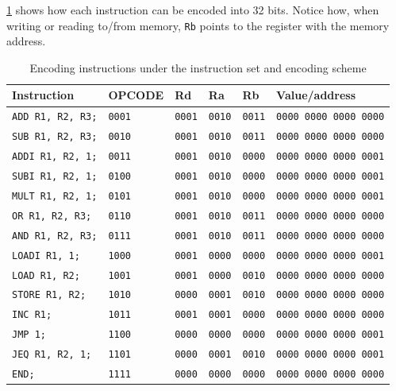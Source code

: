 \documentclass[a4paper, english]{article}
\numberwithin{equation}{section}
\begin{document}
\cref{tbl:encex} shows how each instruction can be encoded into 32 bits. Notice how, when writing or reading to/from memory, \texttt{Rb} points to the register with the memory address.
\begin{table}
    \centering
    \caption{Encoding instructions under the instruction set and encoding scheme}\label{tbl:encex}
    \begin{tabular}{llllll}
        \toprule
        \textbf{Instruction}     & OPCODE        & Rd            & Ra            & Rb            & Value/address                 \\
        \midrule
        \texttt{ADD R1, R2, R3;} & \texttt{0001} & \texttt{0001} & \texttt{0010} & \texttt{0011} & \texttt{0000 0000 0000 0000} \\
        \texttt{SUB R1, R2, R3;} & \texttt{0010} & \texttt{0001} & \texttt{0010} & \texttt{0011} & \texttt{0000 0000 0000 0000} \\
        \texttt{ADDI R1, R2, 1;} & \texttt{0011} & \texttt{0001} & \texttt{0010} & \texttt{0000} & \texttt{0000 0000 0000 0001} \\
        \texttt{SUBI R1, R2, 1;} & \texttt{0100} & \texttt{0001} & \texttt{0010} & \texttt{0000} & \texttt{0000 0000 0000 0001} \\
        \texttt{MULT R1, R2, 1;} & \texttt{0101} & \texttt{0001} & \texttt{0010} & \texttt{0000} & \texttt{0000 0000 0000 0001} \\
        \texttt{OR R1, R2, R3;}  & \texttt{0110} & \texttt{0001} & \texttt{0010} & \texttt{0011} & \texttt{0000 0000 0000 0000} \\
        \texttt{AND R1, R2, R3;} & \texttt{0111} & \texttt{0001} & \texttt{0010} & \texttt{0011} & \texttt{0000 0000 0000 0000} \\
        \texttt{LOADI R1, 1;}    & \texttt{1000} & \texttt{0001} & \texttt{0000} & \texttt{0000} & \texttt{0000 0000 0000 0001} \\
        \texttt{LOAD R1, R2;}    & \texttt{1001} & \texttt{0001} & \texttt{0000} & \texttt{0010} & \texttt{0000 0000 0000 0000} \\
        \texttt{STORE R1, R2;}   & \texttt{1010} & \texttt{0000} & \texttt{0001} & \texttt{0010} & \texttt{0000 0000 0000 0000} \\
        \texttt{INC R1;}         & \texttt{1011} & \texttt{0001} & \texttt{0001} & \texttt{0000} & \texttt{0000 0000 0000 0000} \\
        \texttt{JMP 1;}          & \texttt{1100} & \texttt{0000} & \texttt{0000} & \texttt{0000} & \texttt{0000 0000 0000 0001} \\
        \texttt{JEQ R1, R2, 1;}  & \texttt{1101} & \texttt{0000} & \texttt{0001} & \texttt{0010} & \texttt{0000 0000 0000 0001} \\
        \texttt{END;}            & \texttt{1111} & \texttt{0000} & \texttt{0000} & \texttt{0000} & \texttt{0000 0000 0000 0000} \\
        \bottomrule
    \end{tabular}
\end{table}
\end{document}
